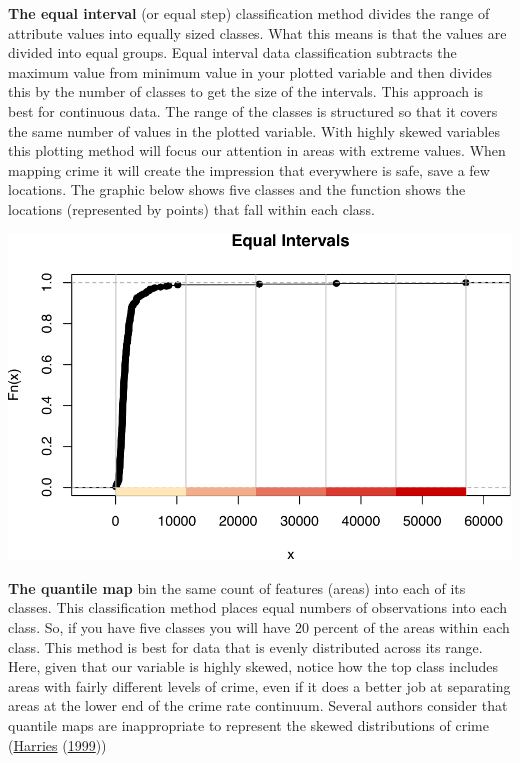 \documentclass[
  krantz2]{krantz}
\begin{document}
\textbf{The equal interval} (or equal step) classification method divides the range of attribute values into equally sized classes. What this means is that the values are divided into equal groups. Equal interval data classification subtracts the maximum value from minimum value in your plotted variable and then divides this by the number of classes to get the size of the intervals. This approach is best for continuous data. The range of the classes is structured so that it covers the same number of values in the plotted variable. With highly skewed variables this plotting method will focus our attention in areas with extreme values. When mapping crime it will create the impression that everywhere is safe, save a few locations. The graphic below shows five classes and the function shows the locations (represented by points) that fall within each class.

\includegraphics{crime_mapping_files/figure-latex/unnamed-chunk-90-1.pdf}

\textbf{The quantile map} bin the same count of features (areas) into each of its classes. This classification method places equal numbers of observations into each class. So, if you have five classes you will have 20 percent of the areas within each class. This method is best for data that is evenly distributed across its range. Here, given that our variable is highly skewed, notice how the top class includes areas with fairly different levels of crime, even if it does a better job at separating areas at the lower end of the crime rate continuum. Several authors consider that quantile maps are inappropriate to represent the skewed distributions of crime (\protect\hyperlink{ref-Harries_1999}{Harries} (\protect\hyperlink{ref-Harries_1999}{1999}))
\end{document}

